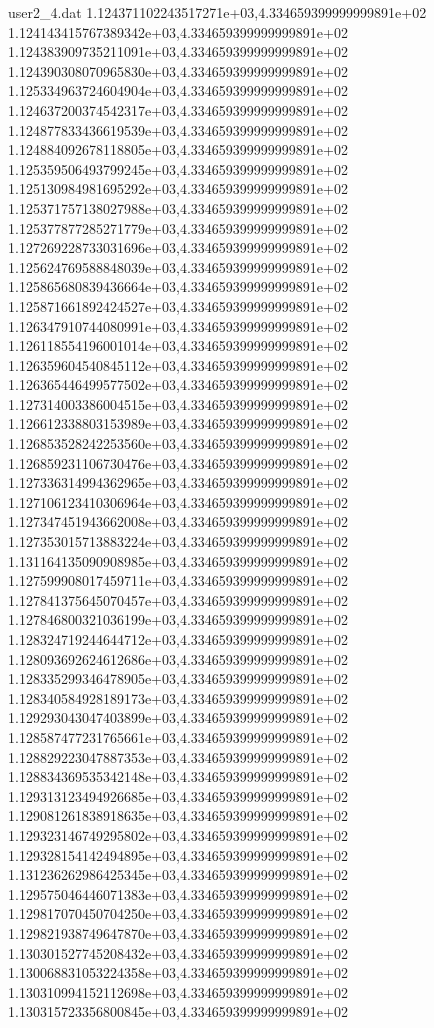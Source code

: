 \begin{filecontents}{user2_4.dat}
1.124371102243517271e+03,4.334659399999999891e+02
1.124143415767389342e+03,4.334659399999999891e+02
1.124383909735211091e+03,4.334659399999999891e+02
1.124390308070965830e+03,4.334659399999999891e+02
1.125334963724604904e+03,4.334659399999999891e+02
1.124637200374542317e+03,4.334659399999999891e+02
1.124877833436619539e+03,4.334659399999999891e+02
1.124884092678118805e+03,4.334659399999999891e+02
1.125359506493799245e+03,4.334659399999999891e+02
1.125130984981695292e+03,4.334659399999999891e+02
1.125371757138027988e+03,4.334659399999999891e+02
1.125377877285271779e+03,4.334659399999999891e+02
1.127269228733031696e+03,4.334659399999999891e+02
1.125624769588848039e+03,4.334659399999999891e+02
1.125865680839436664e+03,4.334659399999999891e+02
1.125871661892424527e+03,4.334659399999999891e+02
1.126347910744080991e+03,4.334659399999999891e+02
1.126118554196001014e+03,4.334659399999999891e+02
1.126359604540845112e+03,4.334659399999999891e+02
1.126365446499577502e+03,4.334659399999999891e+02
1.127314003386004515e+03,4.334659399999999891e+02
1.126612338803153989e+03,4.334659399999999891e+02
1.126853528242253560e+03,4.334659399999999891e+02
1.126859231106730476e+03,4.334659399999999891e+02
1.127336314994362965e+03,4.334659399999999891e+02
1.127106123410306964e+03,4.334659399999999891e+02
1.127347451943662008e+03,4.334659399999999891e+02
1.127353015713883224e+03,4.334659399999999891e+02
1.131164135090908985e+03,4.334659399999999891e+02
1.127599908017459711e+03,4.334659399999999891e+02
1.127841375645070457e+03,4.334659399999999891e+02
1.127846800321036199e+03,4.334659399999999891e+02
1.128324719244644712e+03,4.334659399999999891e+02
1.128093692624612686e+03,4.334659399999999891e+02
1.128335299346478905e+03,4.334659399999999891e+02
1.128340584928189173e+03,4.334659399999999891e+02
1.129293043047403899e+03,4.334659399999999891e+02
1.128587477231765661e+03,4.334659399999999891e+02
1.128829223047887353e+03,4.334659399999999891e+02
1.128834369535342148e+03,4.334659399999999891e+02
1.129313123494926685e+03,4.334659399999999891e+02
1.129081261838918635e+03,4.334659399999999891e+02
1.129323146749295802e+03,4.334659399999999891e+02
1.129328154142494895e+03,4.334659399999999891e+02
1.131236262986425345e+03,4.334659399999999891e+02
1.129575046446071383e+03,4.334659399999999891e+02
1.129817070450704250e+03,4.334659399999999891e+02
1.129821938749647870e+03,4.334659399999999891e+02
1.130301527745208432e+03,4.334659399999999891e+02
1.130068831053224358e+03,4.334659399999999891e+02
1.130310994152112698e+03,4.334659399999999891e+02
1.130315723356800845e+03,4.334659399999999891e+02

\end{filecontents}
